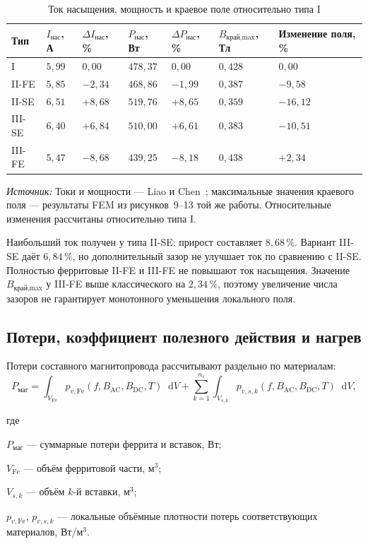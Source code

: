 \documentclass[14pt,a4paper]{extarticle}
\newcommand{\source}[1]{\par\noindent\textit{Источник:} #1\par}
\newcommand{\dd}{\mathop{}\!\mathrm{d}}
\newenvironment{whereblock}
 {\par\noindent где\par
  \begin{list}{}{\setlength{\leftmargin}{12.5mm}
                  \setlength{\itemindent}{-12.5mm}
                  \setlength{\itemsep}{0pt}
                  \setlength{\parsep}{0pt}
                  \setlength{\topsep}{0pt}}}
 {\end{list}}
\newcommand{\whereitem}[2]{\item[] #1 --- #2}
\begin{document}
\begin{table}[H]
\caption{Ток насыщения, мощность и краевое поле относительно типа I}
\label{tab:hybrid-saturation-results}
\centering
\scriptsize
\begin{tabularx}{\textwidth}{>{\raggedright\arraybackslash}p{17mm}
>{\raggedleft\arraybackslash}p{18mm}
>{\raggedleft\arraybackslash}p{21mm}
>{\raggedleft\arraybackslash}p{21mm}
>{\raggedleft\arraybackslash}p{22mm}
>{\raggedleft\arraybackslash}p{21mm} X}
\toprule
Тип & $I_{\text{нас}}$, А & $\Delta I_{\text{нас}}$, \% &
$P_{\text{нас}}$, Вт & $\Delta P_{\text{нас}}$, \% &
$B_{\text{край,max}}$, Тл & Изменение поля, \% \\
\midrule
I      & $5{,}99$ & $0{,}00$  & $478{,}37$ & $0{,}00$  & $0{,}428$ & $0{,}00$ \\
II-FE  & $5{,}85$ & $-2{,}34$ & $468{,}86$ & $-1{,}99$ & $0{,}387$ & $-9{,}58$ \\
II-SE  & $6{,}51$ & $+8{,}68$ & $519{,}76$ & $+8{,}65$ & $0{,}359$ & $-16{,}12$ \\
III-SE & $6{,}40$ & $+6{,}84$ & $510{,}00$ & $+6{,}61$ & $0{,}383$ & $-10{,}51$ \\
III-FE & $5{,}47$ & $-8{,}68$ & $439{,}25$ & $-8{,}18$ & $0{,}438$ & $+2{,}34$ \\
\bottomrule
\end{tabularx}
\end{table}

\source{Токи и мощности --- Liao и Chen~\cite[таблица~9]{liao}; максимальные
значения краевого поля --- результаты FEM из рисунков~9--13 той же работы.
Относительные изменения рассчитаны относительно типа I.}

Наибольший ток получен у типа II-SE: прирост составляет $8{,}68\,\%$.
Вариант III-SE даёт $6{,}84\,\%$, но дополнительный зазор не улучшает ток
по сравнению с II-SE. Полностью ферритовые II-FE и III-FE не повышают ток
насыщения. Значение $B_{\text{край,max}}$ у III-FE выше классического на
$2{,}34\,\%$, поэтому увеличение числа зазоров не гарантирует монотонного
уменьшения локального поля.

\subsection{Потери, коэффициент полезного действия и нагрев}

Потери составного магнитопровода рассчитывают раздельно по материалам:
\begin{equation}
 P_{\text{маг}}=
 \int_{V_{\text{Fe}}}
 p_{v,\text{Fe}}(f,B_{\text{AC}},B_{\text{DC}},T)\dd V+
 \sum_{k=1}^{n_s}\int_{V_{s,k}}
 p_{v,s,k}(f,B_{\text{AC}},B_{\text{DC}},T)\dd V,
 \label{eq:hybrid-core-loss}
\end{equation}
\begin{whereblock}
\whereitem{$P_{\text{маг}}$}{суммарные потери феррита и вставок, Вт;}
\whereitem{$V_{\text{Fe}}$}{объём ферритовой части, м$^3$;}
\whereitem{$V_{s,k}$}{объём $k$-й вставки, м$^3$;}
\whereitem{$p_{v,\text{Fe}}$, $p_{v,s,k}$}{локальные объёмные плотности
потерь соответствующих материалов, Вт/м$^3$.}
\end{whereblock}
\end{document}
